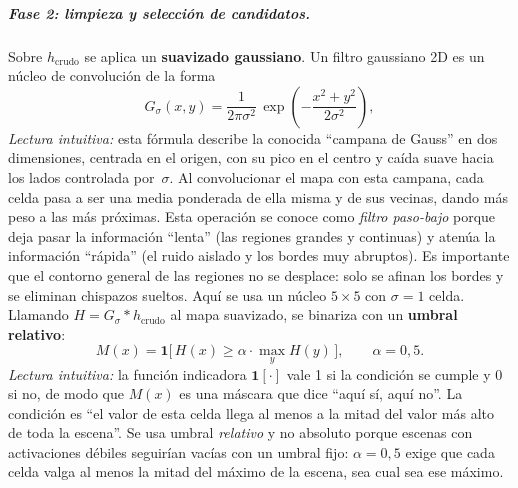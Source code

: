 \documentclass[11pt,fleqn,openany]{book} %
\begin{document}
\subparagraph{Fase 2: limpieza y selección de candidatos.} Sobre $h_{\text{crudo}}$ se aplica un \textbf{suavizado gaussiano}. Un filtro gaussiano 2D es un núcleo de convolución de la forma
%
\begin{equation}
G_\sigma(x,y) = \frac{1}{2\pi\sigma^{2}}\,
\exp\!\left(-\frac{x^{2}+y^{2}}{2\sigma^{2}}\right),
\label{eq:gauss}
\end{equation}
%
\emph{Lectura intuitiva:} esta fórmula describe la conocida ``campana de Gauss'' en dos dimensiones, centrada en el origen, con su pico en el centro y caída suave hacia los lados controlada por~$\sigma$. Al convolucionar el mapa con esta campana, cada celda pasa a ser una media ponderada de ella misma y de sus vecinas, dando más peso a las más próximas. Esta operación se conoce como \emph{filtro paso-bajo} porque deja pasar la información ``lenta'' (las regiones grandes y continuas) y atenúa la información ``rápida'' (el ruido aislado y los bordes muy abruptos). Es importante que el contorno general de las regiones no se desplace: solo se afinan los bordes y se eliminan chispazos sueltos. Aquí se usa un núcleo $5\times 5$ con $\sigma=1$ celda. Llamando $H = G_\sigma * h_{\text{crudo}}$ al mapa suavizado, se binariza con un \textbf{umbral relativo}:
%
\begin{equation}
M(x) = \mathbf{1}\bigl[\,H(x) \geq \alpha\cdot\max_{y} H(y)\,\bigr],
\qquad \alpha = 0{,}5.
\label{eq:rel_threshold}
\end{equation}
%
\emph{Lectura intuitiva:} la función indicadora $\mathbf{1}[\cdot]$ vale 1 si la condición se cumple y 0 si no, de modo que $M(x)$ es una máscara que dice ``aquí sí, aquí no''. La condición es ``el valor de esta celda llega al menos a la mitad del valor más alto de toda la escena''. Se usa umbral \emph{relativo} y no absoluto porque escenas con activaciones débiles seguirían vacías con un umbral fijo: $\alpha = 0{,}5$ exige que cada celda valga al menos la mitad del máximo de la escena, sea cual sea ese máximo.
\end{document}
